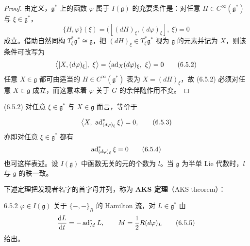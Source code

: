 \begin{proof}
  由定义，$\mathfrak{g}^*$ 上的函数 $\varphi$ 属于 $I(\mathfrak{g})$ 的充要条件是：对任意 $H\in C^\infty(\mathfrak{g}^*)$ 与 $\xi\in\mathfrak{g}^*$，
  \begin{equation}
    \{H,\varphi\}(\xi) = \bigl([(dH)_\xi,(d\varphi)_\xi],\ \xi\bigr) = 0
    \tag{6.5.1}
  \end{equation}
  成立。借助自然同构 $T^*_\xi\mathfrak{g}^*\cong\mathfrak{g}$，把 $(dH)_\xi\in T^*_\xi\mathfrak{g}^*$ 视为 $\mathfrak{g}$ 的元素并记为 $X$，则该条件可改写为
  \begin{equation}
    \bigl\langle [X,(d\varphi)_\xi],\ \xi\bigr\rangle = \bigl\langle \ad_X(d\varphi)_\xi,\ \xi\bigr\rangle = 0
    \tag{6.5.2}
  \end{equation}
  任意 $X\in\mathfrak{g}$ 都可由适当的 $H\in C^\infty(\mathfrak{g}^*)$ 表为 $X=(dH)_\xi$，故 (6.5.2) 必须对任意 $X\in\mathfrak{g}$ 成立，而这意味着 $\varphi$ 关于 $G$ 的余伴随作用不变。
\end{proof}

(6.5.2) 对任意 $\xi\in\mathfrak{g}^*$ 与 $X\in\mathfrak{g}$ 而言，等价于

\begin{equation}
  \bigl\langle X,\ \ad^*_{(d\varphi)_\xi}\xi\bigr\rangle = 0,
  \tag{6.5.3}
\end{equation}
亦即对任意 $\xi\in\mathfrak{g}^*$ 都有
\begin{equation}
  \operatorname{ad}^*_{(d\varphi)_\xi}\xi = 0
  \tag{6.5.4}
\end{equation}
也可这样表述。设 $I(\mathfrak{g})$ 中函数无关的元的个数为 $l$。当 $\mathfrak{g}$ 为半单 Lie 代数时，$l$ 与 $\mathfrak{g}$ 的秩一致。

下述定理把发现者名字的首字母并列，称为 \textbf{AKS 定理}（AKS theorem）：

\begin{theorem*}{6.5.2}
  $\varphi\in I(\mathfrak{g})$ 关于 $\{-,-\}_R$ 的 Hamilton 流，对 $L\in\mathfrak{g}^*$ 由
  \begin{equation}
    \frac{\mathrm{d} L}{\mathrm{d} t} = -\operatorname{ad}^*_M L,\qquad
    M = \frac{1}{2}R(d\varphi)_L
    \tag{6.5.5}
  \end{equation}
  给出。
\end{theorem*}

